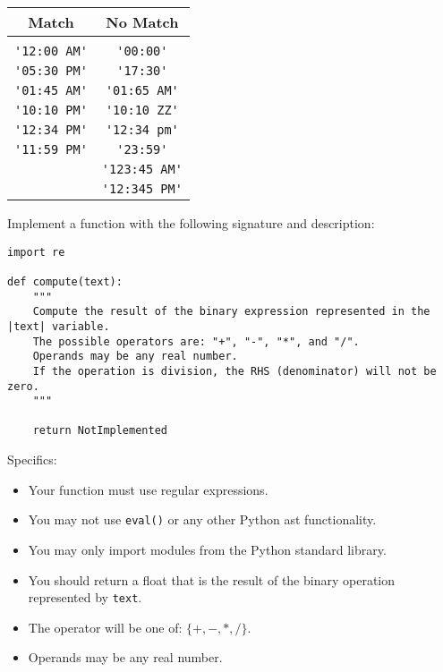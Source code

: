 \documentclass[addpoints]{exam}
\begin{document}
\begin{questions}
\begin{minipage}{\textwidth}
\begin{center}
    \begin{tabular}{ cc }
        Match & No Match \\
        \hline \\
        \verb|'12:00 AM'| & \verb|'00:00'| \\
        \verb|'05:30 PM'| & \verb|'17:30'| \\
        \verb|'01:45 AM'| & \verb|'01:65 AM'| \\
        \verb|'10:10 PM'| & \verb|'10:10 ZZ'| \\
        \verb|'12:34 PM'| & \verb|'12:34 pm'| \\
        \verb|'11:59 PM'| & \verb|'23:59'| \\
         & \verb|'123:45 AM'| \\
         & \verb|'12:345 PM'| \\
    \end{tabular}
\end{center}


\vspace{0.5cm}

\vspace{3cm}

\end{minipage}





\vspace{1cm}

\begin{minipage}{\textwidth}

\question[20]

Implement a function with the following signature and description:

\begin{lstlisting}
import re

def compute(text):
    """
    Compute the result of the binary expression represented in the |text| variable.
    The possible operators are: "+", "-", "*", and "/".
    Operands may be any real number.
    If the operation is division, the RHS (denominator) will not be zero.
    """

    return NotImplemented
\end{lstlisting}

Specifics:
\begin{itemize}
    \item Your function must use regular expressions.
    \item You may not use \verb|eval()| or any other Python ast functionality.
    \item You may only import modules from the Python standard library.
    \item You should return a float that is the result of the binary operation represented by \verb|text|.
    \item The operator will be one of:  $ \{+, -, *, /\} $.
    \item Operands may be any real number.
\end{itemize}



\end{minipage}
\end{questions}
\end{document}
